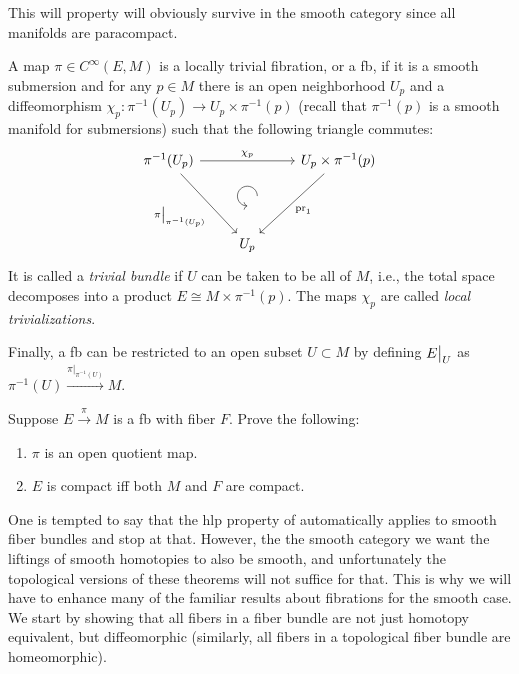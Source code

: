 This will property will obviously survive in the smooth category since all manifolds are paracompact.

\begin{defn}
    A map $\pi\in C^\infty(E,M)$ is a locally trivial fibration, or a \gls{fb}, if it is a smooth submersion and for any $p\in M$ there is an open neighborhood $U_p$ and a diffeomorphism $\chi_p:\pi^{-1}(U_p)\to U_p\times \pi^{-1}(p)$ (recall that $\pi^{-1}(p)$ is a smooth manifold for submersions) such that the following triangle commutes:
    \[
    \begin{tikzcd}[every matrix/.append style={name=m},   
    execute at end picture={\draw [<-] ([xshift=0mm,yshift=-2mm]m-2-2.north) arc[start angle=-90,delta angle=-270,radius=0.25cm];}]
       \pi^{-1}(U_p) \arrow[rr,"\chi_p"]\arrow[ddr,swap,"\restr{\pi}{\pi^{-1}(U_p)}"]& & U_p\times \pi^{-1}(p)\arrow[ddl,"\pr_1"]\\
       & \, & \\
       & U_p & 
    \end{tikzcd}
    \]
    It is called a \emph{trivial bundle} if $U$ can be taken to be all of $M$, i.e., the total space decomposes into a product $E\cong M\times \pi^{-1}(p)$. The maps $\chi_p$ are called \emph{local trivializations}.
    
    Finally, a \gls{fb} can be restricted to an open subset $U\subset M$ by defining $\restr{E}{U}$ as $\pi^{-1}(U)\overset{\pi|_{\pi^{-1}(U)}}{\longrightarrow}M$.
\end{defn}

\begin{xca}
    Suppose $E\overset{\pi}{\to}M$ is a \gls{fb} with fiber $F$. Prove the following:
    \begin{enumerate}[label=(\alph*)]
        \item $\pi$ is an open quotient map.
        \item $E$ is compact iff both $M$ and $F$ are compact.
    \end{enumerate}
\end{xca}


One is tempted to say that the \gls{hlp} property of automatically applies to smooth fiber bundles and stop at that.  However, the the smooth category we want the liftings of smooth homotopies to also be smooth, and unfortunately the topological versions of these theorems will not suffice for that. This is why we will have to enhance many of the familiar results about fibrations for the smooth case. We start by showing that all fibers in a fiber bundle are not just homotopy equivalent, but diffeomorphic (similarly, all fibers in a topological fiber bundle are homeomorphic).

